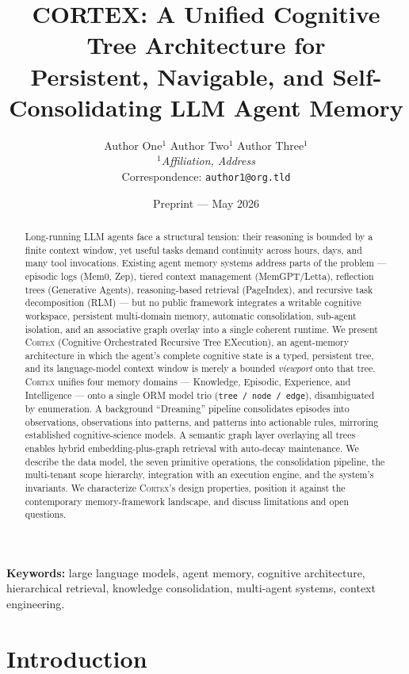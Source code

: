 \documentclass[11pt,a4paper]{article}
\title{
  \vspace{-1.5em}
  \textbf{CORTEX: A Unified Cognitive Tree Architecture for\\
  Persistent, Navigable, and Self-Consolidating LLM Agent Memory}
  \vspace{0.5em}
}
\author{
  Author One$^{1}$ \quad Author Two$^{1}$ \quad Author Three$^{1}$\\[0.5em]
  \small $^{1}$\textit{Affiliation, Address}\\
  \small Correspondence: \texttt{author1@org.tld}
}
\date{\small Preprint --- May 2026}
\theoremstyle{cortexprop}
\newcommand{\code}[1]{\texttt{#1}}
\begin{document}
\maketitle

\begin{abstract}
\noindent
Long-running LLM agents face a structural tension: their reasoning is bounded
by a finite context window, yet useful tasks demand continuity across hours,
days, and many tool invocations. Existing agent memory systems address parts
of the problem --- episodic logs (Mem0, Zep), tiered context management
(MemGPT/Letta), reflection trees (Generative Agents), reasoning-based
retrieval (PageIndex), and recursive task decomposition (RLM) --- but no
public framework integrates a writable cognitive workspace, persistent
multi-domain memory, automatic consolidation, sub-agent isolation, and an
associative graph overlay into a single coherent runtime. We present
\textsc{Cortex} (Cognitive Orchestrated Recursive Tree EXecution), an
agent-memory architecture in which the agent's complete cognitive state is a
typed, persistent tree, and its language-model context window is merely a
bounded \textit{viewport} onto that tree. \textsc{Cortex} unifies four memory
domains --- Knowledge, Episodic, Experience, and Intelligence --- onto a
single ORM model trio (\code{tree / node / edge}), disambiguated by
enumeration. A background ``Dreaming'' pipeline consolidates episodes into
observations, observations into patterns, and patterns into actionable rules,
mirroring established cognitive-science models. A semantic graph layer
overlaying all trees enables hybrid embedding-plus-graph retrieval with
auto-decay maintenance. We describe the data model, the seven primitive
operations, the consolidation pipeline, the multi-tenant scope hierarchy,
integration with an execution engine, and the system's invariants. We
characterize \textsc{Cortex}'s design properties, position it against the
contemporary memory-framework landscape, and discuss limitations and open
questions.
\end{abstract}

\smallskip
\noindent\textbf{Keywords:} large language models, agent memory, cognitive
architecture, hierarchical retrieval, knowledge consolidation, multi-agent
systems, context engineering.

\section{Introduction}
\label{sec:intro}
\end{document}
